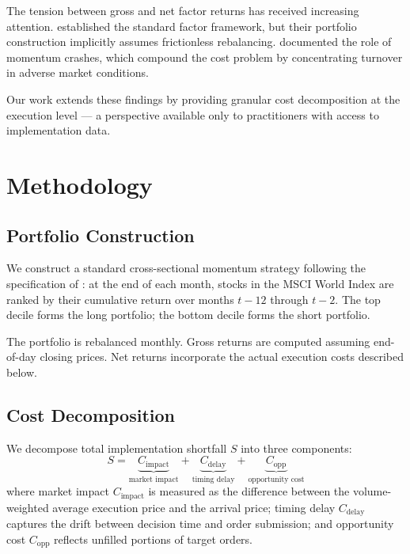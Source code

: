 \documentclass{cris}
\begin{document}
The tension between gross and net factor returns has received increasing attention. \citet{fama1993} established the standard factor framework, but their portfolio construction implicitly assumes frictionless rebalancing. \citet{daniel2016} documented the role of momentum crashes, which compound the cost problem by concentrating turnover in adverse market conditions.

Our work extends these findings by providing granular cost decomposition at the execution level --- a perspective available only to practitioners with access to implementation data.

\section{Methodology}

\subsection{Portfolio Construction}

We construct a standard cross-sectional momentum strategy following the specification of \citet{jegadeesh1993}: at the end of each month, stocks in the MSCI World Index are ranked by their cumulative return over months $t{-}12$ through $t{-}2$. The top decile forms the long portfolio; the bottom decile forms the short portfolio.

The portfolio is rebalanced monthly. Gross returns are computed assuming end-of-day closing prices. Net returns incorporate the actual execution costs described below.

\subsection{Cost Decomposition}

We decompose total implementation shortfall $S$ into three components:
\begin{equation}
  S = \underbrace{C_{\text{impact}}}_{\text{market impact}}
    + \underbrace{C_{\text{delay}}}_{\text{timing delay}}
    + \underbrace{C_{\text{opp}}}_{\text{opportunity cost}}
\end{equation}
where market impact $C_{\text{impact}}$ is measured as the difference between the volume-weighted average execution price and the arrival price; timing delay $C_{\text{delay}}$ captures the drift between decision time and order submission; and opportunity cost $C_{\text{opp}}$ reflects unfilled portions of target orders.
\end{document}
